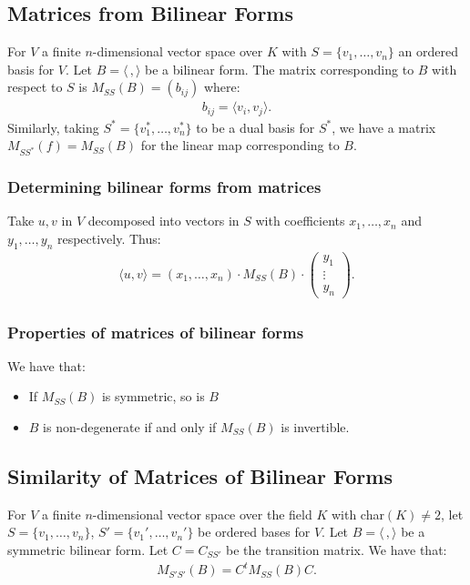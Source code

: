 \subsection{Matrices from Bilinear Forms}

For $V$ a finite $n$-dimensional vector space over $K$ with $S = \{v_1, \ldots, v_n\}$
an ordered basis for $V$. Let $B = \langle \, , \rangle$ be a bilinear form. The matrix corresponding
to $B$ with respect to $S$ is $M_{SS}(B) = (b_{ij})$ where: \begin{gather*}
  b_{ij} = \langle v_i, v_j \rangle.
\end{gather*} Similarly, taking $S^* = \{v^*_1, \ldots, v^*_n\}$ to be a dual basis for
$S^*$, we have a matrix $M_{SS^*}(f) = M_{SS}(B)$ for the linear map corresponding to $B$.

\subsubsection{Determining bilinear forms from matrices}

Take $u, v$ in $V$ decomposed into vectors in $S$ with coefficients $x_1, \ldots, x_n$
and $y_1, \ldots, y_n$ respectively. Thus: \begin{gather*}
  \langle u, v \rangle = (x_1, \ldots, x_n) \cdot M_{SS}(B) \cdot \begin{pmatrix}
    y_1 \\ \vdots \\ y_n
  \end{pmatrix}.
\end{gather*}

\subsubsection{Properties of matrices of bilinear forms}

We have that: \begin{itemize}
  \item If $M_{SS}(B)$ is symmetric, so is $B$
  \item $B$ is non-degenerate if and only if $M_{SS}(B)$ is invertible.
\end{itemize}

\subsection{Similarity of Matrices of Bilinear Forms}

For $V$ a finite $n$-dimensional vector space over the field $K$ with char$(K) \neq 2$, 
let $S = \{v_1, \ldots, v_n\}$, $S' = \{v_1', \ldots, v_n'\}$ be
ordered bases for $V$. Let $B = \langle \, , \rangle$ be a symmetric bilinear form.
Let $C = C_{SS'}$ be the transition matrix. We have that: \begin{gather*}
  M_{S'S'}(B) = C^tM_{SS}(B)C.
\end{gather*}

